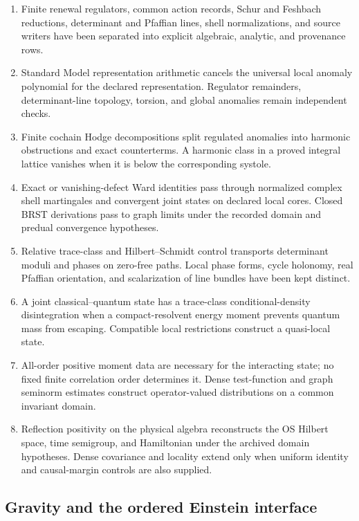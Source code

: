 \documentclass[11pt]{article}
\theoremstyle{remark}
\begin{document}
\begin{enumerate}[leftmargin=2.2em]
\item Finite renewal regulators, common action records, Schur and
      Feshbach reductions, determinant and Pfaffian lines, shell
      normalizations, and source writers have been separated into
      explicit algebraic, analytic, and provenance rows.
\item Standard Model representation arithmetic cancels the
      universal local anomaly polynomial for the declared
      representation.  Regulator remainders, determinant-line
      topology, torsion, and global anomalies remain independent
      checks.
\item Finite cochain Hodge decompositions split regulated anomalies
      into harmonic obstructions and exact counterterms.  A harmonic
      class in a proved integral lattice vanishes when it is below
      the corresponding systole.
\item Exact or vanishing-defect Ward identities pass through
      normalized complex shell martingales and convergent joint
      states on declared local cores.  Closed BRST derivations pass
      to graph limits under the recorded domain and predual
      convergence hypotheses.
\item Relative trace-class and Hilbert--Schmidt control transports
      determinant moduli and phases on zero-free paths.  Local phase
      forms, cycle holonomy, real Pfaffian orientation, and
      scalarization of line bundles have been kept distinct.
\item A joint classical--quantum state has a trace-class
      conditional-density disintegration when a compact-resolvent
      energy moment prevents quantum mass from escaping.
      Compatible local restrictions construct a quasi-local state.
\item All-order positive moment data are necessary for the
      interacting state; no fixed finite correlation order
      determines it.  Dense test-function and graph seminorm
      estimates construct operator-valued distributions on a common
      invariant domain.
\item Reflection positivity on the physical algebra reconstructs
      the OS Hilbert space, time semigroup, and Hamiltonian under the
      archived domain hypotheses.  Dense covariance and locality
      extend only when uniform identity and causal-margin controls
      are also supplied.
\end{enumerate}

\subsection{Gravity and the ordered Einstein interface}
\end{document}

